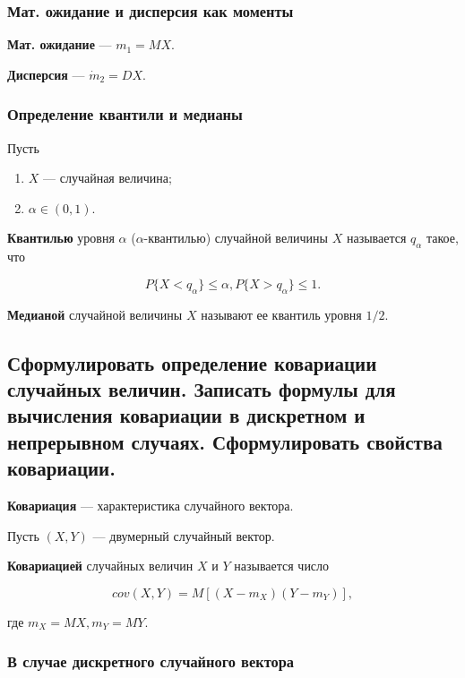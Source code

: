 \subsubsection*{Мат. ожидание и дисперсия как моменты}

\textbf{Мат. ожидание} --- $m_{1} = MX$.

\textbf{Дисперсия} --- $\dot m_{2} = DX$.

\subsubsection*{Определение квантили и медианы}

Пусть

\begin{enumerate}
	\item $X$ --- случайная величина;
	\item $\alpha \in (0, 1)$.
\end{enumerate}

\textbf{Квантилью} уровня $\alpha$ ($\alpha$-квантилью) случайной величины $X$ называется $q_{\alpha}$ такое, что

\begin{equation}
	P\{X < q_{\alpha}\} \leqslant \alpha, P \{X > q_{\alpha}\} \leqslant 1.
\end{equation}

\textbf{Медианой} случайной величины $X$ называют ее квантиль уровня $1/2$.

\subsection{Сформулировать определение ковариации случайных величин. Записать формулы для вычисления ковариации в дискретном и непрерывном случаях. Сформулировать свойства ковариации.}

\textbf{Ковариация} --- характеристика случайного вектора.

Пусть $(X, Y)$ --- двумерный случайный вектор.

\textbf{Ковариацией} случайных величин $X$ и $Y$ называется число

\begin{equation}
	cov(X, Y) = M[(X - m_{X})(Y - m_{Y})],
\end{equation}

где $m_{X} = MX, m_{Y} = MY$.

\subsubsection*{В случае дискретного случайного вектора}

